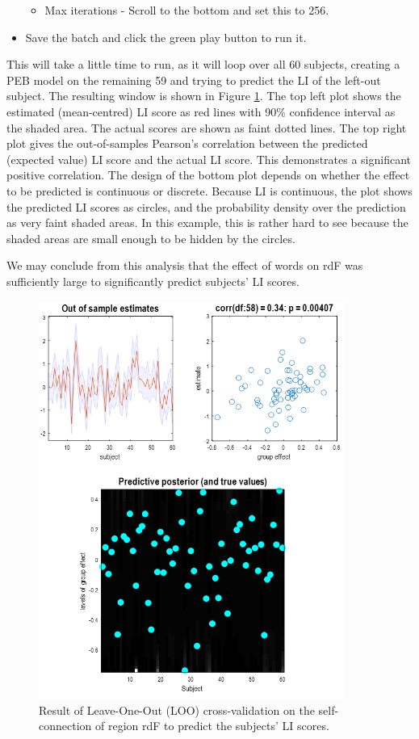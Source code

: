 \documentclass{article}
\begin{document}
\begin{itemize}
\begin{itemize}
        \item Max iterations - Scroll to the bottom and set this to 256.

    \end{itemize}
    
    \item Save the batch and click the green play button to run it.
    
\end{itemize}

This will take a little time to run, as it will loop over all 60 subjects, creating a PEB model on the remaining 59 and trying to predict the LI of the left-out subject. The resulting window is shown in Figure \ref{Fig_peb_loo_gui}. The top left plot shows the estimated (mean-centred) LI score as red lines with 90\% confidence interval as the shaded area. The actual scores are shown as faint dotted lines. The top right plot gives the out-of-samples Pearson's correlation between the predicted (expected value) LI score and the actual LI score. This demonstrates a significant positive correlation. The design of the bottom plot depends on whether the effect to be predicted is continuous or discrete. Because LI is continuous, the plot shows the predicted LI scores as circles, and the probability density over the prediction as very faint shaded areas. In this example, this is rather hard to see because the shaded areas are small enough to be hidden by the circles. 

We may conclude from this analysis that the effect of words on rdF was sufficiently large to significantly predict subjects' LI scores.

\begin{figure}[ht]
\begin{center}
\includegraphics[width=10cm]{"Fig_peb_loo_gui"}
\caption{Result of Leave-One-Out (LOO) cross-validation on the self-connection of region rdF to predict the subjects' LI scores.\label{Fig_peb_loo_gui}}
\end{center}
\end{figure}
\end{document}
